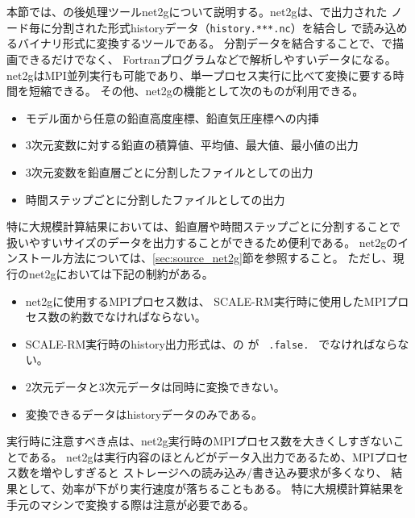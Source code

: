 \section{\SecAdvancePostprosess} \label{sec:net2g}

本節では、\scalerm の後処理ツールnet2gについて説明する。net2gは、\scalerm で出力された
ノード毎に分割された{\netcdf}形式historyデータ（\verb|history.***.nc|）を結合し
{\grads}で読み込めるバイナリ形式に変換するツールである。
分割データを結合することで、{\grads}で描画できるだけでなく、
Fortranプログラムなどで解析しやすいデータになる。
net2gはMPI並列実行も可能であり、単一プロセス実行に比べて変換に要する時間を短縮できる。
その他、net2gの機能として次のものが利用できる。

\begin{itemize}
 \item モデル面から任意の鉛直高度座標、鉛直気圧座標への内挿
 \item 3次元変数に対する鉛直の積算値、平均値、最大値、最小値の出力
 \item 3次元変数を鉛直層ごとに分割したファイルとしての出力
 \item 時間ステップごとに分割したファイルとしての出力
\end{itemize}

特に大規模計算結果においては、鉛直層や時間ステップごとに分割することで
扱いやすいサイズのデータを出力することができるため便利である。
net2gのインストール方法については、\ref{sec:source_net2g}節を参照すること。
ただし、現行のnet2gにおいては下記の制約がある。
\begin{itemize}
 \item net2gに使用するMPIプロセス数は、
SCALE-RM実行時に使用したMPIプロセス数の約数でなければならない。
 \item SCALE-RM実行時のhistory出力形式は、の が \verb| .false. | でなければならない。
 \item 2次元データと3次元データは同時に変換できない。
 \item 変換できるデータはhistoryデータのみである。
\end{itemize}

実行時に注意すべき点は、net2g実行時のMPIプロセス数を大きくしすぎないことである。
net2gは実行内容のほとんどがデータ入出力であるため、MPIプロセス数を増やしすぎると
ストレージへの読み込み/書き込み要求が多くなり、
結果として、効率が下がり実行速度が落ちることもある。
特に大規模計算結果を手元のマシンで変換する際は注意が必要である。

